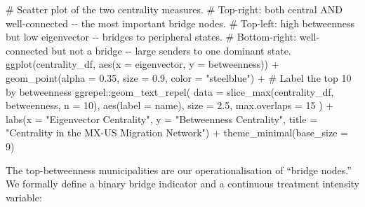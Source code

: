\documentclass[
  11pt,
  letterpaper,
  DIV=11,
  numbers=noendperiod]{scrartcl}
\newenvironment{Shaded}{}{}
\newcommand{\AttributeTok}[1]{\textcolor[rgb]{0.84,0.23,0.29}{#1}}
\newcommand{\CommentTok}[1]{\textcolor[rgb]{0.42,0.45,0.49}{#1}}
\newcommand{\DecValTok}[1]{\textcolor[rgb]{0.00,0.36,0.77}{#1}}
\newcommand{\FloatTok}[1]{\textcolor[rgb]{0.00,0.36,0.77}{#1}}
\newcommand{\FunctionTok}[1]{\textcolor[rgb]{0.44,0.26,0.76}{#1}}
\newcommand{\NormalTok}[1]{\textcolor[rgb]{0.14,0.16,0.18}{#1}}
\newcommand{\SpecialCharTok}[1]{\textcolor[rgb]{0.00,0.36,0.77}{#1}}
\newcommand{\StringTok}[1]{\textcolor[rgb]{0.01,0.18,0.38}{#1}}
\begin{document}
\begin{Shaded}
\begin{Highlighting}[]
\CommentTok{\# Scatter plot of the two centrality measures.}
\CommentTok{\# Top{-}right: both central AND well{-}connected {-}{-} the most important bridge nodes.}
\CommentTok{\# Top{-}left:  high betweenness but low eigenvector {-}{-} bridges to peripheral states.}
\CommentTok{\# Bottom{-}right: well{-}connected but not a bridge {-}{-} large senders to one dominant state.}
\FunctionTok{ggplot}\NormalTok{(centrality\_df, }\FunctionTok{aes}\NormalTok{(}\AttributeTok{x =}\NormalTok{ eigenvector, }\AttributeTok{y =}\NormalTok{ betweenness)) }\SpecialCharTok{+}
  \FunctionTok{geom\_point}\NormalTok{(}\AttributeTok{alpha =} \FloatTok{0.35}\NormalTok{, }\AttributeTok{size =} \FloatTok{0.9}\NormalTok{, }\AttributeTok{color =} \StringTok{"steelblue"}\NormalTok{) }\SpecialCharTok{+}
  \CommentTok{\# Label the top 10 by betweenness}
\NormalTok{  ggrepel}\SpecialCharTok{::}\FunctionTok{geom\_text\_repel}\NormalTok{(}
    \AttributeTok{data    =} \FunctionTok{slice\_max}\NormalTok{(centrality\_df, betweenness, }\AttributeTok{n =} \DecValTok{10}\NormalTok{),}
    \FunctionTok{aes}\NormalTok{(}\AttributeTok{label =}\NormalTok{ name),}
    \AttributeTok{size    =} \FloatTok{2.5}\NormalTok{,}
    \AttributeTok{max.overlaps =} \DecValTok{15}
\NormalTok{  ) }\SpecialCharTok{+}
  \FunctionTok{labs}\NormalTok{(}\AttributeTok{x =} \StringTok{"Eigenvector Centrality"}\NormalTok{,}
       \AttributeTok{y =} \StringTok{"Betweenness Centrality"}\NormalTok{,}
       \AttributeTok{title =} \StringTok{"Centrality in the MX{-}US Migration Network"}\NormalTok{) }\SpecialCharTok{+}
  \FunctionTok{theme\_minimal}\NormalTok{(}\AttributeTok{base\_size =} \DecValTok{9}\NormalTok{)}
\end{Highlighting}
\end{Shaded}

The top-betweenness municipalities are our operationalisation of
``bridge nodes.'' We formally define a binary bridge indicator and a
continuous treatment intensity variable:
\end{document}
